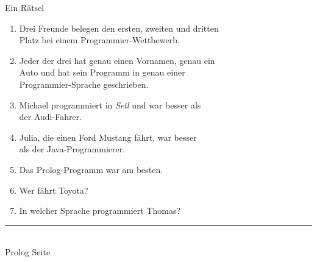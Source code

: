 \documentclass{slides}
\newcommand{\myrule}{\rule{20cm}{1mm}\\ }
\newcounter{mypage}
\begin{document}

\begin{slide}{}
\normalsize
\begin{center}
Ein Rätsel
\end{center}
\vspace{0.5cm}

\footnotesize
\begin{enumerate}
\item Drei Freunde belegen den ersten, zweiten und dritten \\
      Platz bei einem Programmier-Wettbewerb.
\item Jeder der drei hat genau einen Vornamen, genau ein \\
      Auto und hat sein Programm in genau einer \\
      Programmier-Sprache geschrieben.
\item Michael programmiert in \textsl{Setl} und war besser als \\
      der Audi-Fahrer.
\item Julia, die einen Ford Mustang fährt, war besser \\
      als der Java-Programmierer.
\item Das Prolog-Programm war am besten.
\item Wer fährt Toyota?
\item In welcher Sprache programmiert Thomas?
\end{enumerate}



\vspace*{\fill}
\tiny \addtocounter{mypage}{1}
\myrule
Prolog  \hspace*{\fill} Seite 
\end{slide}

\end{document}
